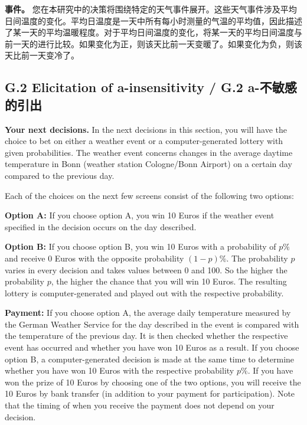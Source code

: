 \documentclass[12pt,a4paper]{article}
\newenvironment{original}
  {\par\medskip\noindent\color{black}\ignorespaces}
  {\par\medskip}
\newenvironment{translation}
  {\par\noindent\color{transblue}\ignorespaces}
  {\par\medskip\medskip}
\begin{document}
\begin{translation}
\textbf{事件。} 您在本研究中的决策将围绕特定的天气事件展开。这些天气事件涉及平均日间温度的变化。平均日温度是一天中所有每小时测量的气温的平均值，因此描述了某一天的平均温暖程度。对于平均日间温度的变化，将某一天的平均日间温度与前一天的进行比较。如果变化为正，则该天比前一天变暖了。如果变化为负，则该天比前一天变冷了。
\end{translation}

\subsection*{G.2 Elicitation of a-insensitivity / G.2 a-不敏感的引出}

\begin{original}
\textbf{Your next decisions.} In the next decisions in this section, you will have the choice to bet on either a weather event or a computer-generated lottery with given probabilities. The weather event concerns changes in the average daytime temperature in Bonn (weather station Cologne/Bonn Airport) on a certain day compared to the previous day.

Each of the choices on the next few screens consist of the following two options:

\textbf{Option A:} If you choose option A, you win 10 Euros if the weather event specified in the decision occurs on the day described.

\textbf{Option B:} If you choose option B, you win 10 Euros with a probability of $p\%$ and receive 0 Euros with the opposite probability $(1-p)\%$. The probability $p$ varies in every decision and takes values between 0 and 100. So the higher the probability $p$, the higher the chance that you will win 10 Euros. The resulting lottery is computer-generated and played out with the respective probability.

\textbf{Payment:} If you choose option A, the average daily temperature measured by the German Weather Service for the day described in the event is compared with the temperature of the previous day. It is then checked whether the respective event has occurred and whether you have won 10 Euros as a result. If you choose option B, a computer-generated decision is made at the same time to determine whether you have won 10 Euros with the respective probability $p\%$. If you have won the prize of 10 Euros by choosing one of the two options, you will receive the 10 Euros by bank transfer (in addition to your payment for participation). Note that the timing of when you receive the payment does not depend on your decision.


\end{original}
\end{document}
